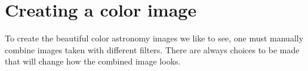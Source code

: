 %	
%
%
%	
%
%
%	

\section{Creating a color image}

To create the beautiful color astronomy images we like to see, one must manually combine images taken with different filters. There are always choices to be made that will change how the combined image looks.

